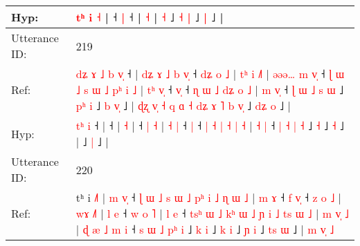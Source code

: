 \documentclass[10pt]{article}
\DeclareRobustCommand{\hl}[1]{{\textcolor{red}{#1}}}
\begin{document}
\begin{longtable}{ll}
Hyp: & \hl{}\hl{}\hl{}\hl{}\hl{}\hl{}\hl{}\hl{}\hl{}\hl{}\hl{}\hl{}\hl{}\hl{}\hl{}\hl{}\hl{}\hl{}\hl{t}\hl{ʰ} \hl{i} \hl{˧} |\hl{}\hl{} ˧\hl{}\hl{} \hl{|} ˧\hl{}\hl{}\hl{}\hl{}\hl{}\hl{}\hl{}\hl{}\hl{}\hl{}\hl{}\hl{} |\hl{}\hl{}\hl{}\hl{}\hl{} \hl{}\hl{˧} |\hl{}\hl{}\hl{} \hl{˧} ˩\hl{}\hl{}\hl{}\hl{}\hl{}\hl{}\hl{} \hl{˧} \hl{|} ˩\hl{}\hl{}\hl{} \hl{|} ˩ |\hl{}\hl{}\hl{}\hl{}\hl{}\hl{}\hl{}
 \\
\midrule
Utterance ID: & 219 \\
Ref: & \hl{d}\hl{ʑ}\hl{ }\hl{ɤ}\hl{ }\hl{˩}\hl{ }\hl{b} \hl{v}\hl{̩} ˧ |\hl{ }\hl{d}\hl{ʑ}\hl{ }\hl{ɤ}\hl{ }\hl{˩}\hl{ }\hl{b}\hl{ }\hl{v}\hl{̩} ˧\hl{ }\hl{d}\hl{ʑ}\hl{ }\hl{o}\hl{ }\hl{˩} |\hl{ }\hl{t}\hl{ʰ}\hl{ }\hl{i} \hl{˩}\hl{˥} |\hl{ }\hl{ə}\hl{ə}\hl{ə}\hl{…}\hl{ }\hl{m}\hl{ }\hl{v}\hl{̩} ˧\hl{ }\hl{ɭ}\hl{ }\hl{ɯ}\hl{ }\hl{˩}\hl{ }\hl{s}\hl{ }\hl{ɯ}\hl{ }\hl{˩}\hl{ }\hl{p}\hl{ʰ} \hl{i} \hl{˩} | \hl{t}\hl{ʰ} \hl{v}\hl{̩} ˧ \hl{v}\hl{̩} ˧ \hl{ɳ} \hl{ɯ} \hl{˩} \hl{d}\hl{ʑ} \hl{o} \hl{˩} | \hl{m} \hl{v}\hl{̩} ˧\hl{ }\hl{ɭ} \hl{ɯ} \hl{˩} \hl{s} \hl{ɯ} ˩\hl{ }\hl{p}\hl{ʰ} \hl{i} ˩\hl{ }\hl{b} \hl{v}\hl{̩} ˩ |\hl{ }\hl{ɖ}\hl{ʐ}\hl{ }\hl{v}\hl{̩}\hl{ }\hl{˧}\hl{ }\hl{q}\hl{ }\hl{ɑ}\hl{ }\hl{˧}\hl{ }\hl{d}\hl{ʑ}\hl{ }\hl{ɤ}\hl{ }\hl{˥}\hl{ }\hl{b}\hl{ }\hl{v}\hl{̩} ˩\hl{ }\hl{d}\hl{ʑ} \hl{o} ˩ |
 \\
Hyp: & \hl{}\hl{}\hl{}\hl{}\hl{}\hl{}\hl{t}\hl{ʰ} \hl{}\hl{i} ˧ |\hl{}\hl{}\hl{}\hl{}\hl{}\hl{}\hl{}\hl{}\hl{}\hl{}\hl{}\hl{} ˧\hl{}\hl{}\hl{}\hl{}\hl{}\hl{}\hl{} |\hl{}\hl{}\hl{}\hl{}\hl{} \hl{}\hl{˧} |\hl{}\hl{}\hl{}\hl{}\hl{}\hl{}\hl{}\hl{}\hl{}\hl{} ˧\hl{}\hl{}\hl{}\hl{}\hl{}\hl{}\hl{}\hl{}\hl{}\hl{}\hl{}\hl{}\hl{}\hl{}\hl{} \hl{|} \hl{˧} | \hl{}\hl{˧} \hl{}\hl{|} ˧ \hl{}\hl{|} ˧ \hl{|} \hl{˧} \hl{|} \hl{}\hl{˧} \hl{|} \hl{˧} | \hl{˧} \hl{}\hl{|} ˧\hl{}\hl{} \hl{|} \hl{˧} \hl{|} \hl{˧} ˩\hl{}\hl{}\hl{} \hl{˧} ˩\hl{}\hl{} \hl{}\hl{˧} ˩ |\hl{}\hl{}\hl{}\hl{}\hl{}\hl{}\hl{}\hl{}\hl{}\hl{}\hl{}\hl{}\hl{}\hl{}\hl{}\hl{}\hl{}\hl{}\hl{}\hl{}\hl{}\hl{}\hl{}\hl{}\hl{}\hl{} ˩\hl{}\hl{}\hl{} \hl{|} ˩ |
 \\
\midrule
Utterance ID: & 220 \\
Ref: & tʰ i \hl{˩}\hl{˥} |\hl{ }\hl{m}\hl{ }\hl{v}\hl{̩} ˧\hl{ }\hl{ɭ}\hl{ }\hl{ɯ}\hl{ }\hl{˩}\hl{ }\hl{s}\hl{ }\hl{ɯ}\hl{ }\hl{˩}\hl{ }\hl{p}\hl{ʰ}\hl{ }\hl{i}\hl{ }\hl{˩}\hl{ }\hl{ɳ}\hl{ }\hl{ɯ}\hl{ }\hl{˩} |\hl{ }\hl{m}\hl{ }\hl{ɤ} ˧\hl{ }\hl{f} \hl{v}\hl{̩} ˧\hl{ }\hl{z}\hl{ }\hl{o}\hl{ }\hl{˩} |\hl{ }\hl{w}\hl{ɤ} \hl{˩}\hl{˥} |\hl{ }\hl{l}\hl{ }\hl{e} ˧\hl{ }\hl{w}\hl{ }\hl{o}\hl{ }\hl{˥} |\hl{ }\hl{l}\hl{ }\hl{e} ˧\hl{ }\hl{t}\hl{s}\hl{ʰ}\hl{ }\hl{ɯ}\hl{ }\hl{˩}\hl{ }\hl{k}\hl{ʰ}\hl{ }\hl{ɯ}\hl{ }\hl{˩}\hl{ }\hl{ɲ}\hl{ }\hl{i}\hl{ }\hl{˩}\hl{ }\hl{t}\hl{s}\hl{ }\hl{ɯ}\hl{ }\hl{˩} |\hl{ }\hl{m}\hl{ }\hl{v}\hl{̩} \hl{˩} |\hl{ }\hl{ɖ}\hl{ }\hl{æ}\hl{ }\hl{˩}\hl{ }\hl{m}\hl{ }\hl{i} ˧\hl{ }\hl{s}\hl{ }\hl{ɯ}\hl{ }\hl{˩} \hl{p}\hl{ʰ} \hl{i} ˩\hl{ }\hl{k} \hl{i} ˩\hl{ }\hl{k} \hl{i} ˩\hl{ }\hl{ɲ} \hl{i} ˩\hl{ }\hl{t}\hl{s} \hl{ɯ} ˩ |\hl{ }\hl{m}\hl{ }\hl{v}\hl{̩}\hl{ }\hl{˩}

\end{longtable}
\end{document}
